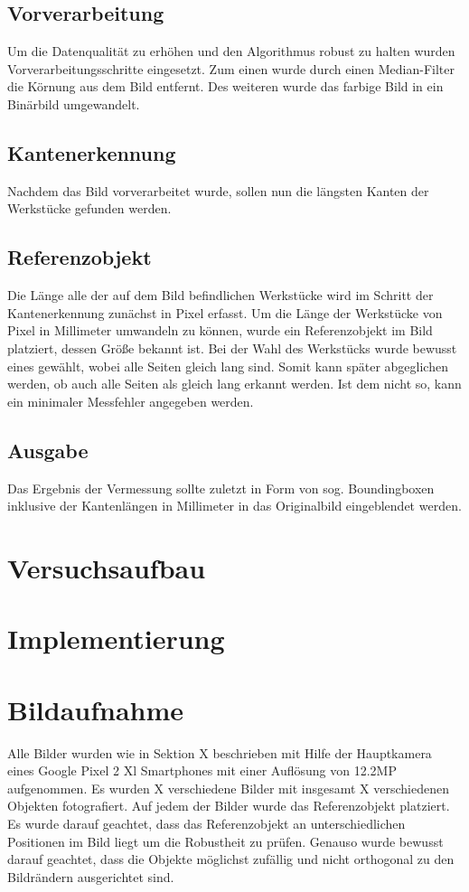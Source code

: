 \documentclass[twocolumn,10pt]{asme2ej}
\begin{document}
\subsection{Vorverarbeitung}
Um die Datenqualität zu erhöhen und den Algorithmus robust zu halten wurden Vorverarbeitungsschritte eingesetzt. Zum einen wurde durch einen Median-Filter die Körnung aus dem Bild entfernt. Des weiteren wurde das farbige Bild in ein Binärbild umgewandelt.

\subsection{Kantenerkennung}
Nachdem das Bild vorverarbeitet wurde, sollen nun die längsten Kanten der Werkstücke gefunden werden. 

\subsection{Referenzobjekt}
 Die Länge alle der auf dem Bild befindlichen Werkstücke wird im Schritt der Kantenerkennung zunächst in Pixel erfasst. Um die Länge der Werkstücke von Pixel in Millimeter umwandeln zu können, wurde ein Referenzobjekt im Bild platziert, dessen Größe bekannt ist. Bei der Wahl des Werkstücks wurde bewusst eines gewählt, wobei alle Seiten gleich lang sind. Somit kann später abgeglichen werden, ob auch alle Seiten als gleich lang erkannt werden. Ist dem nicht so, kann ein minimaler Messfehler angegeben werden.
 
 \subsection{Ausgabe}
 Das Ergebnis der Vermessung sollte zuletzt in Form von sog. Boundingboxen inklusive der Kantenlängen in Millimeter in das Originalbild eingeblendet werden.

\section{Versuchsaufbau}

\section{Implementierung}

\section{Bildaufnahme}
Alle Bilder wurden wie in Sektion X beschrieben mit Hilfe der Hauptkamera eines Google Pixel 2 Xl Smartphones mit einer Auflösung von 12.2MP aufgenommen. Es wurden X verschiedene Bilder mit insgesamt X verschiedenen Objekten fotografiert. Auf jedem der Bilder wurde das Referenzobjekt platziert. Es wurde darauf geachtet, dass das Referenzobjekt an unterschiedlichen Positionen im Bild liegt um die Robustheit zu prüfen. Genauso wurde bewusst darauf geachtet, dass die Objekte möglichst zufällig und nicht orthogonal zu den Bildrändern ausgerichtet sind.
\end{document}
